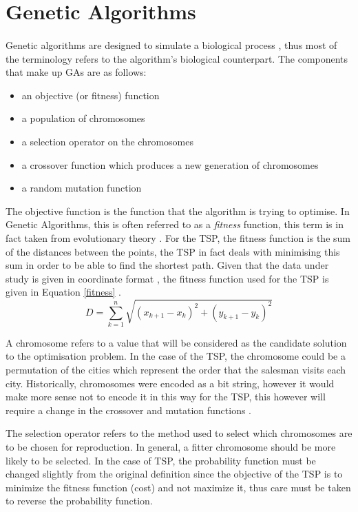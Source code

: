 \documentclass[11pt,a4paper,final]{article}
\begin{document}
	\section{Genetic Algorithms}
	\label{GAs}
	\paragraph{} Genetic algorithms are designed to simulate a biological process \cite{GeneticAlgorithms}, thus most of the terminology refers to the algorithm's biological counterpart. The components that make up GAs are as follows:
	\begin{itemize}
		\item an objective (or fitness) function
		\item a population of chromosomes
		\item a selection operator on the chromosomes
		\item a crossover function which produces a new generation of chromosomes
		\item a random mutation function
	\end{itemize}
	\par The objective function is the function that the algorithm is trying to optimise. In Genetic Algorithms, this is often referred to as a \textit{fitness} function, this term is in fact taken from evolutionary theory \cite{GeneticAlgorithms}. For the TSP, the fitness function is the sum of the distances between the points, the TSP in fact deals with minimising this sum in order to be able to find the shortest path. Given that the data under study is given in coordinate format \cite{data}, the fitness function used for the TSP is given in Equation \ref{fitness} \cite{GeneticAlgorithms}.
	\begin{equation}
	\label{fitness}
	D=\sum_{k=1}^{n}\sqrt{(x_{k+1}-x_k)^2+(y_{k+1}-y_k)^2}
	\end{equation}
	\par A chromosome refers to a value that will be considered as the candidate solution to the optimisation problem. In the case of the TSP, the chromosome could be a permutation of the cities which represent the order that the salesman visits each city. Historically, chromosomes were encoded as a bit string, however it would make more sense not to encode it in this way for the TSP, this however will require a change in the crossover and mutation functions \cite{GeneticAlgorithms}.\\
	\par The selection operator refers to the method used to select which chromosomes are to be chosen for reproduction. In general, a fitter chromosome should be more likely to be selected. In the case of TSP, the probability function must be changed slightly from the original definition since the objective of the TSP is to minimize the fitness function (cost) and not maximize it, thus care must be taken to reverse the probability function. 
	
\end{document}
